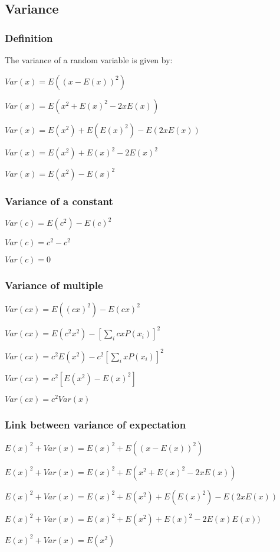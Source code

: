 
\subsection{Variance}

\subsubsection{Definition}

The variance of a random variable is given by:

\(Var(x)=E((x-E(x))^2)\)

\(Var(x)=E(x^2+E(x)^2-2xE(x))\)

\(Var(x)=E(x^2)+E(E(x)^2)-E(2xE(x))\)

\(Var(x)=E(x^2)+E(x)^2-2E(x)^2\)

\(Var(x)=E(x^2)-E(x)^2\)

\subsubsection{Variance of a constant}

\(Var(c)=E(c^2)-E(c)^2\)

\(Var(c)= c^2-c^2\)

\(Var(c)=0\)

\subsubsection{Variance of multiple}

\(Var(cx)=E((cx)^2)-E(cx)^2\)

\(Var(cx)=E(c^2x^2)-[\sum_i cx P(x_i)]^2\)

\(Var(cx)=c^2E(x^2)-c^2[\sum_i x P(x_i)]^2\)

\(Var(cx)=c^2[E(x^2)- E(x)^2]\)

\(Var(cx)=c^2Var(x)\)

\subsubsection{Link between variance of expectation}

\(E(x)^2+Var(x)=E(x)^2+E((x-E(x))^2)\)

\(E(x)^2+Var(x)=E(x)^2+E(x^2+E(x)^2-2xE(x))\)

\(E(x)^2+Var(x)=E(x)^2+E(x^2)+E(E(x)^2)-E(2xE(x))\)

\(E(x)^2+Var(x)=E(x)^2+E(x^2)+E(x)^2-2E(x)E(x))\)

\(E(x)^2+Var(x)=E(x^2)\)

